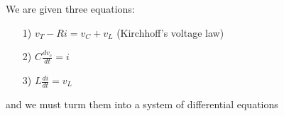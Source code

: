 \documentclass[preview]{standalone}
\begin{document}
\begin{center}
We are given three equations: 
                \begin{enumerate}
                    \item[1)] $v_T - Ri = v_C + v_L$ (Kirchhoff’s voltage law)
                    \item[2)] $C\frac{dv_c}{dt} = i$
                    \item[3)] $L\frac{di}{dt} = v_L$
                \end{enumerate}
                \vspace{1em}
                and we must turm them into a system of differential equations
\end{center}
\end{document}
